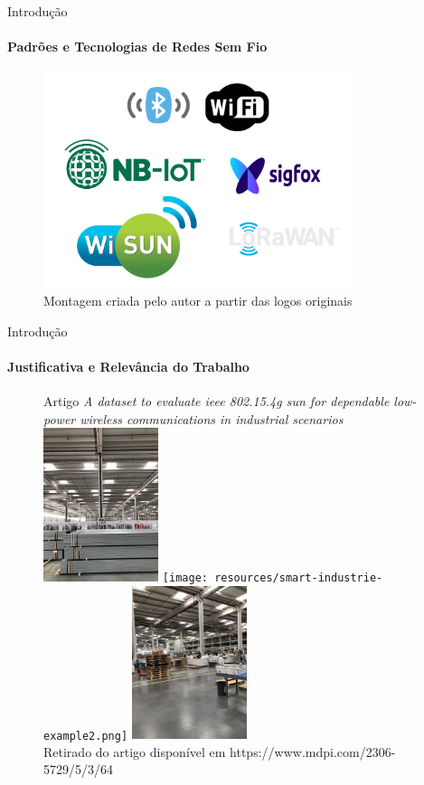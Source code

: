 \documentclass[c]{beamer}
\begin{document}
\begin{darkframes}
  \begin{frame}{Introdução}
    \framesubtitle{Padrões e Tecnologias de Redes Sem Fio}
    \begin{figure}[ht]
      \centering
      \includegraphics[width=0.8\textwidth]{resources/tecnologias-sem-fio.png}\\
      \footnotesize{Montagem criada pelo autor a partir das logos originais}
    \end{figure}
  \end{frame}

  \begin{frame}{Introdução}
    \framesubtitle{Justificativa e Relevância do Trabalho}
    \begin{figure}[ht]
      \centering
      Artigo \emph{A dataset to evaluate ieee 802.15.4g sun for dependable low-power wireless communications in industrial scenarios}
      \includegraphics[width=0.3\textwidth]{resources/smart-industrie-example.png}
      \texttt{[image: resources/smart-industrie-example2.png]}
      \includegraphics[width=0.3\textwidth]{resources/smart-industrie-example3.png}\\
      \footnotesize{Retirado do artigo disponível em https://www.mdpi.com/2306-5729/5/3/64}
    \end{figure}
  \end{frame}


\end{darkframes}
\end{document}
